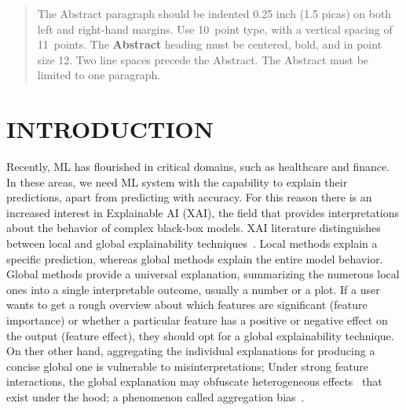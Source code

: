 \documentclass[twoside]{article}
\begin{document}
%

%


\begin{abstract}
  The Abstract paragraph should be indented 0.25 inch (1.5 picas) on
  both left and right-hand margins. Use 10~point type, with a vertical
  spacing of 11~points. The \textbf{Abstract} heading must be centered,
  bold, and in point size 12. Two line spaces precede the
  Abstract. The Abstract must be limited to one paragraph.
\end{abstract}


\section{INTRODUCTION}

Recently, ML has flourished in critical domains, such as healthcare
and finance. In these areas, we need ML system with the capability to
explain their predictions, apart from predicting with accuracy. For
this reason there is an increased interest in Explainable AI (XAI),
the field that provides interpretations about the behavior of complex
black-box models. XAI literature distinguishes between local and
global explainability
techniques~\citep{Molnar2020interpretable}. Local methods explain a
specific prediction, whereas global methods explain the entire model
behavior. Global methods provide a universal explanation, summarizing
the numerous local ones into a single interpretable outcome, usually a
number or a plot. If a user wants to get a rough overview about which
features are significant (feature importance) or whether a particular
feature has a positive or negative effect on the output (feature
effect), they should opt for a global explainability technique. On
ther other hand, aggregating the individual explanations for producing
a concise global one is vulnerable to misinterpretations; Under strong
feature interactions, the global explanation may obfuscate
heterogeneous effects~\citep{Herbinger2022repid} that exist under the
hood; a phenomenon called aggregation bias~\citep{mehrabi2021survey}.
\end{document}
